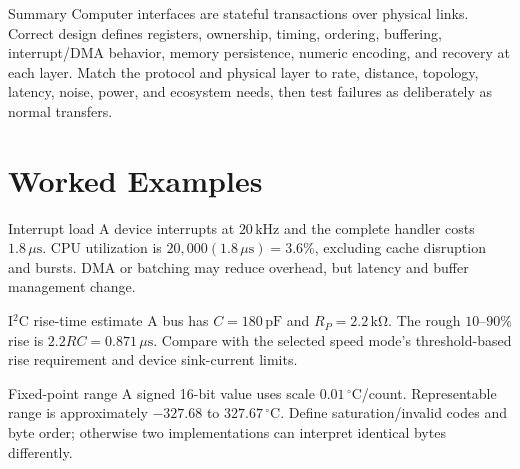 \documentclass[10pt,letterpaper]{article}
\begin{document}
\begin{CornellNotesTable}
\end{CornellNotesTable}
\begin{CornellSummaryBox}{Summary}
Computer interfaces are stateful transactions over physical links. Correct design defines registers, ownership, timing, ordering, buffering, interrupt/DMA behavior, memory persistence, numeric encoding, and recovery at each layer. Match the protocol and physical layer to rate, distance, topology, latency, noise, power, and ecosystem needs, then test failures as deliberately as normal transfers.
\end{CornellSummaryBox}
\section{Worked Examples}
\begin{CornellExamBox}{Interrupt load}
A device interrupts at $20\,\mathrm{kHz}$ and the complete handler costs $1.8\,\mu\mathrm{s}$. CPU utilization is $20{,}000(1.8\,\mu\mathrm{s})=3.6\%$, excluding cache disruption and bursts. DMA or batching may reduce overhead, but latency and buffer management change.
\end{CornellExamBox}
\begin{CornellExamBox}{I$^2$C rise-time estimate}
A bus has $C=180\,\mathrm{pF}$ and $R_P=2.2\,\mathrm{k\Omega}$. The rough $10$--$90\%$ rise is $2.2RC=0.871\,\mu\mathrm{s}$. Compare with the selected speed mode's threshold-based rise requirement and device sink-current limits.
\end{CornellExamBox}
\begin{CornellExamBox}{Fixed-point range}
A signed 16-bit value uses scale $0.01\,^{\circ}\mathrm{C}$/count. Representable range is approximately $-327.68$ to $327.67\,^{\circ}\mathrm{C}$. Define saturation/invalid codes and byte order; otherwise two implementations can interpret identical bytes differently.
\end{CornellExamBox}
\end{document}
